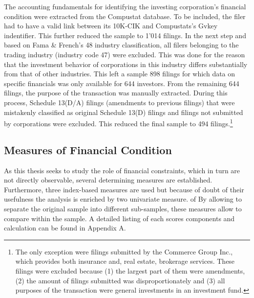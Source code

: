 \documentclass[12pt]{article}
\begin{document}
The accounting fundamentals for identifying the investing corporation's financial condition were extracted from the Compustat database. To be included, the filer had to have a valid link between its 10K-CIK and Compustats's Gvkey indentifier. This further reduced the sample to 1'014 filings. In the next step and based on Fama \& French's 48 industry classification, all filers belonging to the trading industry (industry code 47) were excluded. This was done for the reason that the investment behavior of corporations in this industry differs substantially from that of other industries. This left a sample 898 filings for which data on specific financials was only available for 644 investors. From the remaining 644 filings, the purpose of the transaction was manually extracted. During this process, Schedule 13(D/A) filings (amendments to previous filings) that were mistakenly classified as original Schedule 13(D) filings and filings not submitted by corporations were excluded. This reduced the final sample to 494 filings.\footnote{The only exception were filings submitted by the Commerce Group Inc., which provides both insurance and, real estate, brokerage services. These filings were excluded because (1) the largest part of them were amendments, (2) the amount of filings submitted was disproportionately and (3) all purposes of the transaction were general investments in an investment fund.} 

\subsection{Measures of Financial Condition}

As this thesis seeks to study the role of financial constraints, which in turn are not directly observable, several determining measures are established. Furthermore, three index-based measures are used but because of doubt of their usefulness the analysis is enriched by two univariate measure. of  By allowing to separate the original sample into different sub-samples, these measures allow to compare within the sample. A detailed listing of each scores components and calculation can be found in Appendix A.\\
\end{document}
